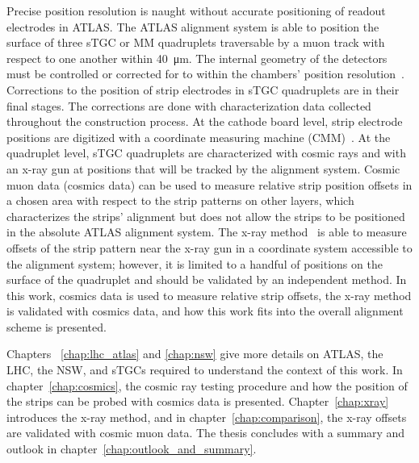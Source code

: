 Precise position resolution is naught without accurate positioning of readout electrodes in ATLAS. The ATLAS alignment system is able to position the surface of three sTGC or MM quadruplets traversable by a muon track with respect to one another within \SI{40}{\micro\meter}. The internal geometry of the detectors must be controlled or corrected for to within the chambers' position resolution~\cite{nsw_tdr}. Corrections to the position of strip electrodes in sTGC quadruplets are in their final stages. The corrections are done with characterization data collected throughout the construction process. At the cathode board level, strip electrode positions are digitized with a coordinate measuring machine (CMM)~\cite{carlson_results_2019}. At the quadruplet level, sTGC quadruplets are characterized with cosmic rays and with an x-ray gun at positions that will be tracked by the alignment system. Cosmic muon data (cosmics data) can be used to measure relative strip position offsets in a chosen area with respect to the strip patterns on other layers, which characterizes the strips' alignment but does not allow the strips to be positioned in the absolute ATLAS alignment system. The x-ray method~\cite{lefebvre_precision_2020} is able to measure offsets of the strip pattern near the x-ray gun in a coordinate system accessible to the alignment system; however, it is limited to a handful of positions on the surface of the quadruplet and should be validated by an independent method. In this work, cosmics data is used to measure relative strip offsets, the x-ray method is validated with cosmics data, and how this work fits into the overall alignment scheme is presented.

Chapters ~\ref{chap:lhc_atlas} and \ref{chap:nsw} give more details on ATLAS, the LHC, the NSW, and sTGCs required to understand the context of this work. In chapter~\ref{chap:cosmics}, the cosmic ray testing procedure and how the position of the strips can be probed with cosmics data is presented. Chapter~\ref{chap:xray} introduces the x-ray method, and in chapter~\ref{chap:comparison}, the x-ray offsets are validated with cosmic muon data. The thesis concludes with a summary and outlook in chapter~\ref{chap:outlook_and_summary}.

